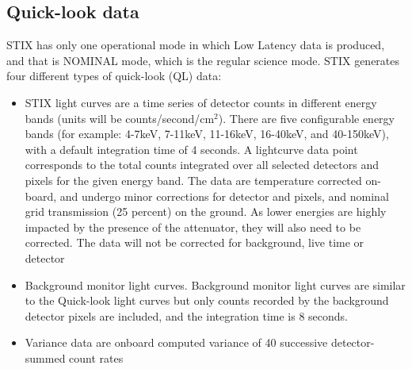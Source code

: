 \documentclass[referee]{aa} %
\begin{document}
\subsection{Quick-look data}
STIX has only one operational mode in which Low Latency data is produced, and that is  NOMINAL mode, which is the regular science mode.
STIX generates four different types of quick-look (QL) data:
\begin{itemize}
\item STIX light curves are a time series of detector counts in different energy bands (units will be counts/second/cm$^2$). There are five configurable energy bands (for example: 4-7keV, 7-11keV, 11-16keV, 16-40keV, and 40-150keV), with a default integration time of 4 seconds. 
A lightcurve data point corresponds to the total counts integrated over all selected detectors and pixels for the given energy band. 
The data are temperature corrected on-board, and undergo minor corrections for detector and pixels,
and nominal grid transmission (25 percent) on the ground. As lower energies are highly impacted by the presence of the attenuator, they will also need to be corrected. The data will not be corrected for background, live time or detector
\item Background monitor light curves. Background monitor light curves are similar to the Quick-look light curves but only
counts recorded by the background detector pixels are included, and the integration time is 8 seconds.
\item Variance data are onboard computed variance of 40 successive detector-summed count rates

\end{itemize}
\end{document}
